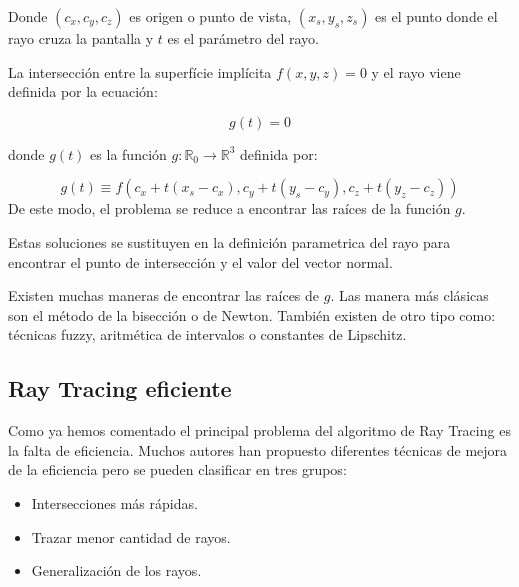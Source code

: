 Donde $(c_x,c_y,c_z)$ es origen o punto de vista, $(x_s,y_s,z_s)$ es el punto donde el rayo cruza la pantalla y $t$ es el parámetro del rayo.
\par La intersección entre la superfície implícita $f(x,y,z) = 0$ y el rayo viene definida por la ecuación:

$$g(t) = 0$$

donde $g(t)$ es la función $g : \mathbb{R}_0 \to \mathbb{R}^3$ definida por:

\begin{equation}
g(t) \equiv f(c_x + t(x_s - c_x), c_y + t(y_s - c_y), c_z + t(y_z - c_z))
\nonumber
\end{equation}
De este modo, el problema se reduce a encontrar las raíces de la función $g$.
\par Estas soluciones se sustituyen en la definición parametrica del rayo para encontrar el punto de intersección y el valor del vector normal.
\par Existen muchas maneras  de encontrar las raíces de $g$. Las manera más clásicas son el método de la bisección o de Newton\cite{Hart01}. También existen de otro tipo como: técnicas fuzzy,\cite{Foufou96} aritmética de intervalos\cite{Mitchell90} o constantes de Lipschitz.\cite{Kalra89}

\subsection{Ray Tracing eficiente}

Como ya hemos comentado el principal problema del algoritmo de Ray Tracing es la falta de eficiencia. Muchos autores han propuesto diferentes técnicas de mejora de la eficiencia pero se pueden clasificar en tres grupos:

\begin{itemize}
\item Intersecciones más rápidas.
\item Trazar menor cantidad de rayos.
\item Generalización de los rayos.
\end{itemize}

